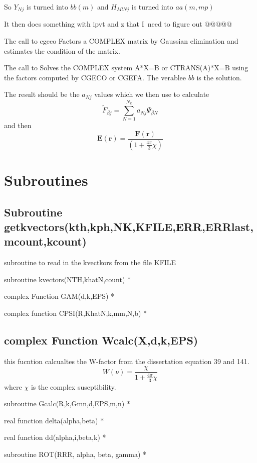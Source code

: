 \documentclass{article}
\begin{document}
So $Y_{Nj}$ is turned into $bb\left( m\right) $ and $H_{MlNj}$ is turned
into $aa(m,mp)$

It then does something with ipvt and z that I\ need to figure out @@@@@

The call to cgeco Factors a COMPLEX matrix by Gaussian elimination and
estimates the condition of the matrix.

The call to Solves the COMPLEX system A*X=B or CTRANS(A)*X=B using the
factors computed by CGECO or CGEFA. The verablee $bb$ is the solution.

The result should be the $a_{Nj}$ values which we then use to calculate 
\begin{equation}
\tilde{F}_{\beta j}\mathbf{=}\sum_{N=1}^{N_{k}}a_{Nj}\Psi _{\beta N}
\end{equation}%
and then 
\[
\mathbf{E}(\mathbf{r})=\frac{\mathbf{F}(\mathbf{r})}{(1+\frac{4\pi }{3}\chi )%
} 
\]

\section{Subroutines}

\subsection{Subroutine
getkvectors(kth,kph,NK,KFILE,ERR,ERRlast,mcount,kcount)}

subroutine to read in the kvectkors from the file KFILE

subroutine kvectors(NTH,khatN,count) *

complex Function GAM(d,k,EPS) *

complex function CPSI(R,KhatN,k,mm,N,b) *

\subsection{complex Function Wcalc(X,d,k,EPS)}

this fucntion calcualtes the W-factor from the dissertation equation 39 and
141.%
\[
W\left( \nu \right) =\frac{\chi }{1+\frac{4\pi }{3}\chi } 
\]%
where $\chi $ is the complex suseptibility.

subroutine Gcalc(R,k,Gmn,d,EPS,m,n) *

real function delta(alpha,beta) *

real function dd(alpha,i,beta,k) *

subroutine ROT(RRR, alpha, beta, gamma) *
\end{document}
